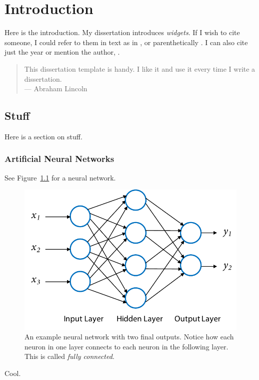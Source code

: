 \chapter{Introduction}

Here is the introduction. My dissertation introduces \emph{widgets}. If I wish
to cite someone, I could refer to them in text as in \citet{zongker2006chicken},
or parenthetically \citep{zongker2006chicken}. I can also cite just the
year \citeyearpar{zongker2006chicken} or mention the author,
\citeauthor{zongker2006chicken}.


\begin{quote}
This dissertation template is handy. I like it and use it every time I write a
dissertation.\\
\hspace*{\fill} --- Abraham Lincoln \citeyearpar{zongker2006chicken}
\end{quote}


\section{Stuff}
\label{sec:stuff}

Here is a section on stuff.

\subsection{Artificial Neural Networks}
\label{sec:neuralnet}

See Figure~\ref{fig:neuralnet} for a neural network.

\begin{figure}[th]
	\begin{center}
	   \includegraphics[width=0.8\linewidth]{figures/neuralnet}
	\end{center}
	\caption[An example neural network with two final outputs]
		{An example neural network with two final outputs. Notice how each
		neuron in one layer connects to each neuron in the following layer. This
		is called \emph{fully connected}.}
	\label{fig:neuralnet}
\end{figure}

Cool.
